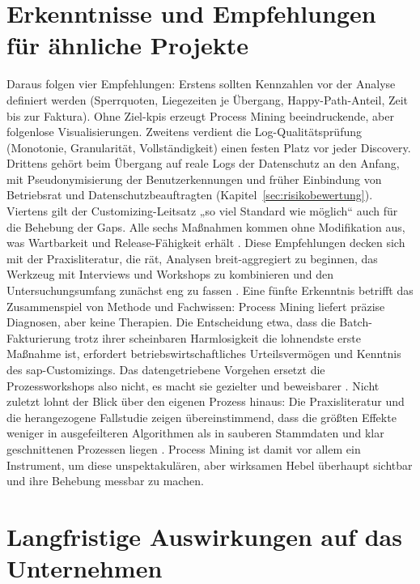 \section{Erkenntnisse und Empfehlungen für ähnliche Projekte}\label{sec:erkenntnisse-empfehlungen}

Daraus folgen vier Empfehlungen: Erstens sollten Kennzahlen vor der Analyse definiert werden (Sperrquoten, Liegezeiten je Übergang, Happy-Path-Anteil, Zeit bis zur Faktura). Ohne Ziel-\gls{kpi}s erzeugt Process Mining beeindruckende, aber folgenlose Visualisierungen. Zweitens verdient die Log-Qualitätsprüfung (Monotonie, Granularität, Vollständigkeit) einen festen Platz vor jeder Discovery. Drittens gehört beim Übergang auf reale Logs der Datenschutz an den Anfang, mit Pseudonymisierung der Benutzerkennungen und früher Einbindung von Betriebsrat und Datenschutzbeauftragten (Kapitel~\ref{sec:risikobewertung}). Viertens gilt der Customizing-Leitsatz „so viel Standard wie möglich“ auch für die Behebung der Gaps. Alle sechs Maßnahmen kommen ohne Modifikation aus, was Wartbarkeit und Release-Fähigkeit erhält \parencite[Folie~248]{coletta2026_0505}. Diese Empfehlungen decken sich mit der Praxisliteratur, die rät, Analysen breit-aggregiert zu beginnen, das Werkzeug mit Interviews und Workshops zu kombinieren und den Untersuchungsumfang zunächst eng zu fassen \parencite[S.~71 f.]{adolfsson2026o2c}. Eine fünfte Erkenntnis betrifft das Zusammenspiel von Methode und Fachwissen: Process Mining liefert präzise Diagnosen, aber keine Therapien. Die Entscheidung etwa, dass die Batch-Fakturierung trotz ihrer scheinbaren Harmlosigkeit die lohnendste erste Maßnahme ist, erfordert betriebswirtschaftliches Urteilsvermögen und Kenntnis des \gls{sap}-Customizings. Das datengetriebene Vorgehen ersetzt die Prozessworkshops also nicht, es macht sie gezielter und beweisbarer \parencite[Folie~247]{coletta2026_0505}. Nicht zuletzt lohnt der Blick über den eigenen Prozess hinaus: Die Praxisliteratur und die herangezogene Fallstudie zeigen übereinstimmend, dass die größten Effekte weniger in ausgefeilteren Algorithmen als in sauberen Stammdaten und klar geschnittenen Prozessen liegen \parencites[S.~110 ff.]{nadukuru2024o2c}[S.~71 f.]{adolfsson2026o2c}. Process Mining ist damit vor allem ein Instrument, um diese unspektakulären, aber wirksamen Hebel überhaupt sichtbar und ihre Behebung messbar zu machen.


\section{Langfristige Auswirkungen auf das Unternehmen}\label{sec:langfristige-auswirkungen}

